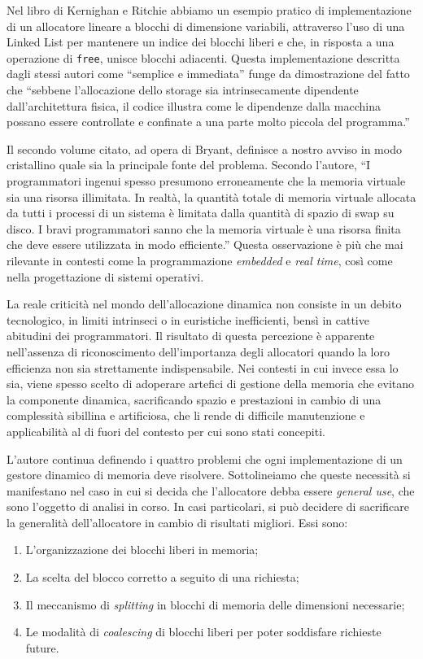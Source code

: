 Nel libro di Kernighan e Ritchie abbiamo un esempio pratico di implementazione di un allocatore lineare a blocchi di dimensione variabili, attraverso l’uso di una Linked List per mantenere un indice dei blocchi liberi e che, in risposta a una operazione di \texttt{free}, unisce blocchi adiacenti. Questa implementazione descritta dagli stessi autori come ``semplice e immediata'' funge da dimostrazione del fatto che ``sebbene l’allocazione dello storage sia intrinsecamente dipendente dall’architettura fisica, il codice illustra come le dipendenze dalla macchina possano essere controllate e confinate a una parte molto piccola del programma.''

Il secondo volume citato, ad opera di Bryant, definisce a nostro avviso in modo cristallino quale sia la principale fonte del problema. Secondo l’autore, ``I programmatori ingenui spesso presumono erroneamente che la memoria virtuale sia una risorsa illimitata. In realtà, la quantità totale di memoria virtuale allocata da tutti i processi di un sistema è limitata dalla quantità di spazio di swap su disco. I bravi programmatori sanno che la memoria virtuale è una risorsa finita che deve essere utilizzata in modo efficiente.'' Questa osservazione è più che mai rilevante in contesti come la programmazione \textit{embedded} e \textit{real time}, così come nella progettazione di sistemi operativi.

La reale criticità nel mondo dell’allocazione dinamica non consiste in un debito tecnologico, in limiti intrinseci o in euristiche inefficienti, bensì in cattive abitudini dei programmatori. Il risultato di questa percezione è apparente nell’assenza di riconoscimento dell’importanza degli allocatori quando la loro efficienza non sia strettamente indispensabile. Nei contesti in cui invece essa lo sia, viene spesso scelto di adoperare artefici di gestione della memoria che evitano la componente dinamica, sacrificando spazio e prestazioni in cambio di una complessità sibillina e artificiosa, che li rende di difficile manutenzione e applicabilità al di fuori del contesto per cui sono stati concepiti.

L’autore continua definendo i quattro problemi che ogni implementazione di un gestore dinamico di memoria deve risolvere. Sottolineiamo che queste necessità si manifestano nel caso in cui si decida che l’allocatore debba essere \textit{general use}, che sono l’oggetto di analisi in corso. In casi particolari, si può decidere di sacrificare la generalità dell’allocatore in cambio di risultati migliori. Essi sono:
\begin{enumerate}
  \item L’organizzazione dei blocchi liberi in memoria;
  \item La scelta del blocco corretto a seguito di una richiesta;
  \item Il meccanismo di \textit{splitting} in blocchi di memoria delle dimensioni necessarie;
  \item Le modalità di \textit{coalescing} di blocchi liberi per poter soddisfare richieste future.
\end{enumerate}

